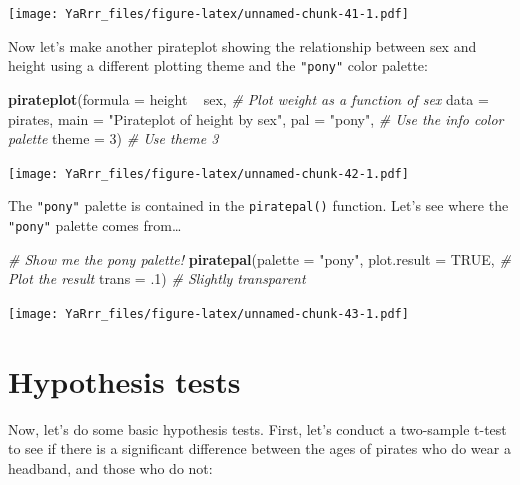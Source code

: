 \documentclass[]{book}
\newenvironment{Shaded}{\begin{snugshade}}{\end{snugshade}}
\newcommand{\KeywordTok}[1]{\textcolor[rgb]{0.13,0.29,0.53}{\textbf{{#1}}}}
\newcommand{\DataTypeTok}[1]{\textcolor[rgb]{0.13,0.29,0.53}{{#1}}}
\newcommand{\DecValTok}[1]{\textcolor[rgb]{0.00,0.00,0.81}{{#1}}}
\newcommand{\StringTok}[1]{\textcolor[rgb]{0.31,0.60,0.02}{{#1}}}
\newcommand{\CommentTok}[1]{\textcolor[rgb]{0.56,0.35,0.01}{\textit{{#1}}}}
\newcommand{\OtherTok}[1]{\textcolor[rgb]{0.56,0.35,0.01}{{#1}}}
\newcommand{\NormalTok}[1]{{#1}}
\theoremstyle{definition}
\theoremstyle{definition}
\theoremstyle{remark}
\begin{document}
\texttt{[image: YaRrr\_files/figure-latex/unnamed-chunk-41-1.pdf]}

Now let's make another pirateplot showing the relationship between sex
and height using a different plotting theme and the \texttt{"pony"}
color palette:

\begin{Shaded}
\begin{Highlighting}[]
\KeywordTok{pirateplot}\NormalTok{(}\DataTypeTok{formula =} \NormalTok{height ~}\StringTok{ }\NormalTok{sex,               }\CommentTok{# Plot weight as a function of sex}
           \DataTypeTok{data =} \NormalTok{pirates,                       }
           \DataTypeTok{main =} \StringTok{"Pirateplot of height by sex"}\NormalTok{,}
           \DataTypeTok{pal =} \StringTok{"pony"}\NormalTok{,                         }\CommentTok{# Use the info color palette}
           \DataTypeTok{theme =} \DecValTok{3}\NormalTok{)                            }\CommentTok{# Use theme 3}
\end{Highlighting}
\end{Shaded}

\texttt{[image: YaRrr\_files/figure-latex/unnamed-chunk-42-1.pdf]}

The \texttt{"pony"} palette is contained in the \texttt{piratepal()}
function. Let's see where the \texttt{"pony"} palette comes from\ldots{}

\begin{Shaded}
\begin{Highlighting}[]
\CommentTok{# Show me the pony palette!}
\KeywordTok{piratepal}\NormalTok{(}\DataTypeTok{palette =} \StringTok{"pony"}\NormalTok{,}
          \DataTypeTok{plot.result =} \OtherTok{TRUE}\NormalTok{,   }\CommentTok{# Plot the result}
          \DataTypeTok{trans =} \NormalTok{.}\DecValTok{1}\NormalTok{)           }\CommentTok{# Slightly transparent}
\end{Highlighting}
\end{Shaded}

\texttt{[image: YaRrr\_files/figure-latex/unnamed-chunk-43-1.pdf]}

\section{Hypothesis tests}\label{hypothesis-tests}

Now, let's do some basic hypothesis tests. First, let's conduct a
two-sample t-test to see if there is a significant difference between
the ages of pirates who do wear a headband, and those who do not:
\end{document}
